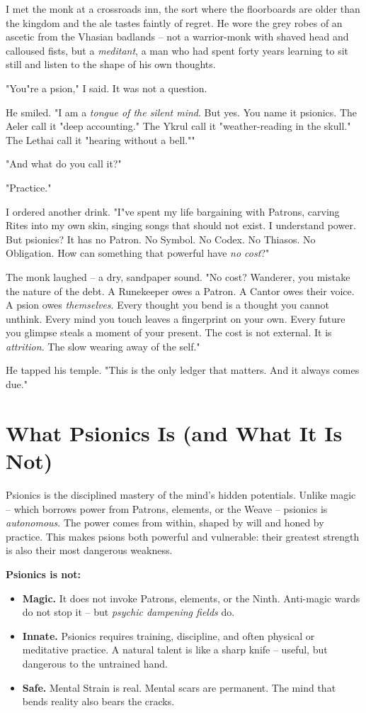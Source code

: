 \documentclass[10pt,a5paper]{book}
\begin{document}
I met the monk at a crossroads inn, the sort where the floorboards are older than the kingdom and the ale tastes faintly of regret. He wore the grey robes of an ascetic from the Vhasian badlands -- not a warrior-monk with shaved head and calloused fists, but a \textit{meditant}, a man who had spent forty years learning to sit still and listen to the shape of his own thoughts.

"You"re a psion," I said. It was not a question.

He smiled. "I am a \textit{tongue of the silent mind}. But yes. You name it psionics. The Aeler call it "deep accounting." The Ykrul call it "weather-reading in the skull." The Lethai call it "hearing without a bell.""

"And what do you call it?"

"Practice."

I ordered another drink. "I"ve spent my life bargaining with Patrons, carving Rites into my own skin, singing songs that should not exist. I understand power. But psionics? It has no Patron. No Symbol. No Codex. No Thiasos. No Obligation. How can something that powerful have \textit{no cost}?"

The monk laughed -- a dry, sandpaper sound. "No cost? Wanderer, you mistake the nature of the debt. A Runekeeper owes a Patron. A Cantor owes their voice. A psion owes \textit{themselves}. Every thought you bend is a thought you cannot unthink. Every mind you touch leaves a fingerprint on your own. Every future you glimpse steals a moment of your present. The cost is not external. It is \textit{attrition}. The slow wearing away of the self."

He tapped his temple. "This is the only ledger that matters. And it always comes due."

\section{What Psionics Is (and What It Is Not)}

Psionics is the disciplined mastery of the mind's hidden potentials. Unlike magic -- which borrows power from Patrons, elements, or the Weave -- psionics is \textit{autonomous}. The power comes from within, shaped by will and honed by practice. This makes psions both powerful and vulnerable: their greatest strength is also their most dangerous weakness.

\textbf{Psionics is not:}
\begin{itemize}
    \item \textbf{Magic.} It does not invoke Patrons, elements, or the Ninth. Anti-magic wards do not stop it -- but \textit{psychic dampening fields} do.
    \item \textbf{Innate.} Psionics requires training, discipline, and often physical or meditative practice. A natural talent is like a sharp knife -- useful, but dangerous to the untrained hand.
    \item \textbf{Safe.} Mental Strain is real. Mental scars are permanent. The mind that bends reality also bears the cracks.
\end{itemize}
\end{document}
